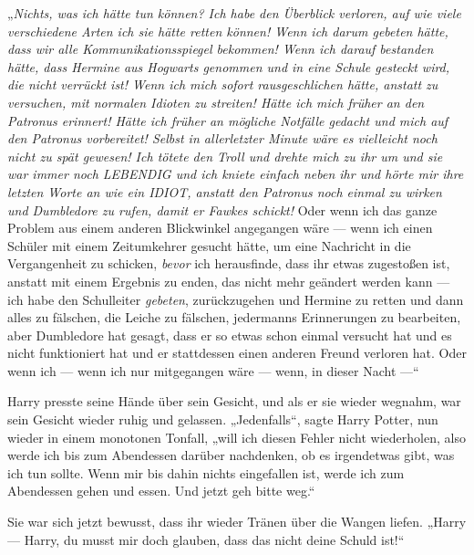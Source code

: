 „\emph{Nichts, was ich hätte \emph{tun} können? Ich habe den Überblick verloren, auf wie viele verschiedene Arten ich sie hätte retten können! Wenn ich darum gebeten hätte, dass wir alle Kommunikationsspiegel bekommen! Wenn ich darauf bestanden hätte, dass Hermine aus Hogwarts genommen und in eine Schule gesteckt wird, die nicht verrückt ist! Wenn ich mich sofort rausgeschlichen hätte, anstatt zu versuchen, mit normalen Idioten zu streiten! Hätte ich mich früher an den Patronus erinnert! Hätte ich früher an mögliche Notfälle gedacht und mich auf den Patronus vorbereitet! Selbst in allerletzter Minute wäre es vielleicht noch nicht zu spät gewesen! Ich tötete den Troll und drehte mich zu ihr um und sie war immer noch LEBENDIG und ich kniete einfach neben ihr und hörte mir ihre letzten Worte an wie ein IDIOT, anstatt den Patronus noch einmal zu wirken und Dumbledore zu rufen, damit er Fawkes schickt!} Oder wenn ich das ganze Problem aus einem anderen Blickwinkel angegangen wäre — wenn ich einen Schüler mit einem Zeitumkehrer gesucht hätte, um eine Nachricht in die Vergangenheit zu schicken, \emph{bevor} ich herausfinde, dass ihr etwas zugestoßen ist, anstatt mit einem Ergebnis zu enden, das nicht mehr geändert werden kann — ich habe den Schulleiter \emph{gebeten}, zurückzugehen und Hermine zu retten und dann alles zu fälschen, die Leiche zu fälschen, jedermanns Erinnerungen zu bearbeiten, aber Dumbledore hat gesagt, dass er so etwas schon einmal versucht hat und es nicht funktioniert hat und er stattdessen einen anderen Freund verloren hat. Oder wenn ich — wenn ich nur mitgegangen wäre — wenn, in dieser Nacht —“


Harry presste seine Hände über sein Gesicht, und als er sie wieder wegnahm, war sein Gesicht wieder ruhig und gelassen.
„Jedenfalls“, sagte Harry Potter, nun wieder in einem monotonen Tonfall, „will ich diesen Fehler nicht wiederholen, also werde ich bis zum Abendessen darüber nachdenken, ob es irgendetwas gibt, was ich tun sollte. Wenn mir bis dahin nichts eingefallen ist, werde ich zum Abendessen gehen und essen. Und jetzt geh bitte weg.“

Sie war sich jetzt bewusst, dass ihr wieder Tränen über die Wangen liefen.
„Harry — Harry, du musst mir doch glauben, dass das nicht deine Schuld ist!“

